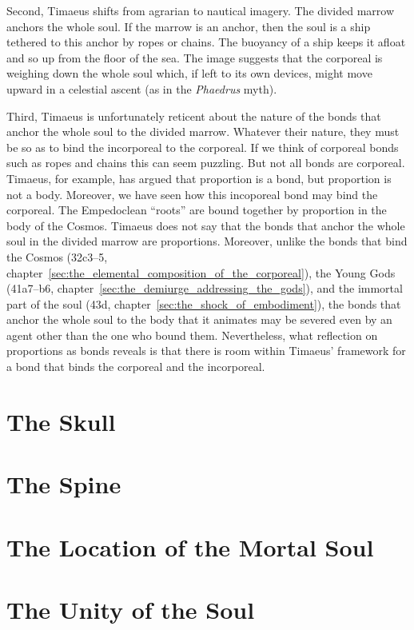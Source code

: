 Second, Timaeus shifts from agrarian to nautical imagery. The divided marrow anchors the whole soul. If the marrow is an anchor, then the soul is a ship tethered to this anchor by ropes or chains. The buoyancy of a ship keeps it afloat and so up from the floor of the sea. The image suggests that the corporeal is weighing down the whole soul which, if left to its own devices, might move upward in a celestial ascent (as in the \emph{Phaedrus} myth).

Third, Timaeus is unfortunately reticent about the nature of the bonds that anchor the whole soul to the divided marrow. Whatever their nature, they must be so as to bind the incorporeal to the corporeal. If we think of corporeal bonds such as ropes and chains this can seem puzzling. But not all bonds are corporeal. Timaeus, for example, has argued that proportion is a bond, but proportion is not a body. Moreover, we have seen how this incoporeal bond may bind the corporeal. The Empedoclean ``roots'' are bound together by proportion in the body of the Cosmos. Timaeus does not say that the bonds that anchor the whole soul in the divided marrow are proportions. Moreover, unlike the bonds that bind the Cosmos (32c3--5, chapter~\ref{sec:the_elemental_composition_of_the_corporeal}), the Young Gods (41a7--b6, chapter~\ref{sec:the_demiurge_addressing_the_gods}), and the immortal part of the soul (43d, chapter~\ref{sec:the_shock_of_embodiment}), the bonds that anchor the whole soul to the body that it animates may be severed even by an agent other than the one who bound them. Nevertheless, what reflection on proportions as bonds reveals is that there is room within Timaeus' framework for a bond that binds the corporeal and the incorporeal.


\section{The Skull} %
\label{sec:the_skull}




\section{The Spine} %
\label{sec:the_spine}



\section{The Location of the Mortal Soul} %
\label{sec:the_location_of_the_mortal_soul}




\section{The Unity of the Soul} %
\label{sec:the_unity_of_the_soul}


